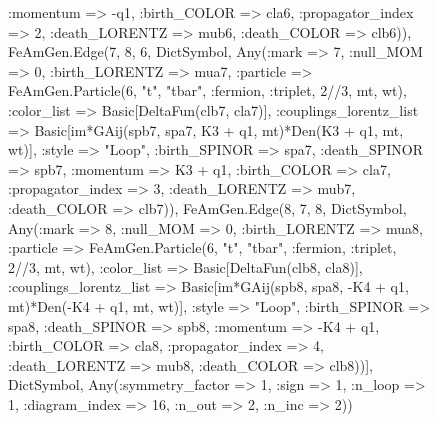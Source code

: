 \documentclass{revtex4}
\begin{document}
\begin{figure}[!htb]
\begin{center}
{:momentum => -q1, :birth_COLOR => cla6, :propagator_index => 2, :death_LORENTZ => mub6, :death_COLOR => clb6)), FeAmGen.Edge(7, 8, 6, Dict{Symbol, Any}(:mark => 7, :null_MOM => 0, :birth_LORENTZ => mua7, :particle => FeAmGen.Particle(6, "t", "tbar", :fermion, :triplet, 2//3, mt, wt), :color_list => Basic[DeltaFun(clb7, cla7)], :couplings_lorentz_list => Basic[im*GAij(spb7, spa7, K3 + q1, mt)*Den(K3 + q1, mt, wt)], :style => "Loop", :birth_SPINOR => spa7, :death_SPINOR => spb7, :momentum => K3 + q1, :birth_COLOR => cla7, :propagator_index => 3, :death_LORENTZ => mub7, :death_COLOR => clb7)), FeAmGen.Edge(8, 7, 8, Dict{Symbol, Any}(:mark => 8, :null_MOM => 0, :birth_LORENTZ => mua8, :particle => FeAmGen.Particle(6, "t", "tbar", :fermion, :triplet, 2//3, mt, wt), :color_list => Basic[DeltaFun(clb8, cla8)], :couplings_lorentz_list => Basic[im*GAij(spb8, spa8, -K4 + q1, mt)*Den(-K4 + q1, mt, wt)], :style => "Loop", :birth_SPINOR => spa8, :death_SPINOR => spb8, :momentum => -K4 + q1, :birth_COLOR => cla8, :propagator_index => 4, :death_LORENTZ => mub8, :death_COLOR => clb8))], Dict{Symbol, Any}(:symmetry_factor => 1, :sign => 1, :n_loop => 1, :diagram_index => 16, :n_out => 2, :n_inc => 2)) 
}
\end{center}
\end{figure}
\end{document}
